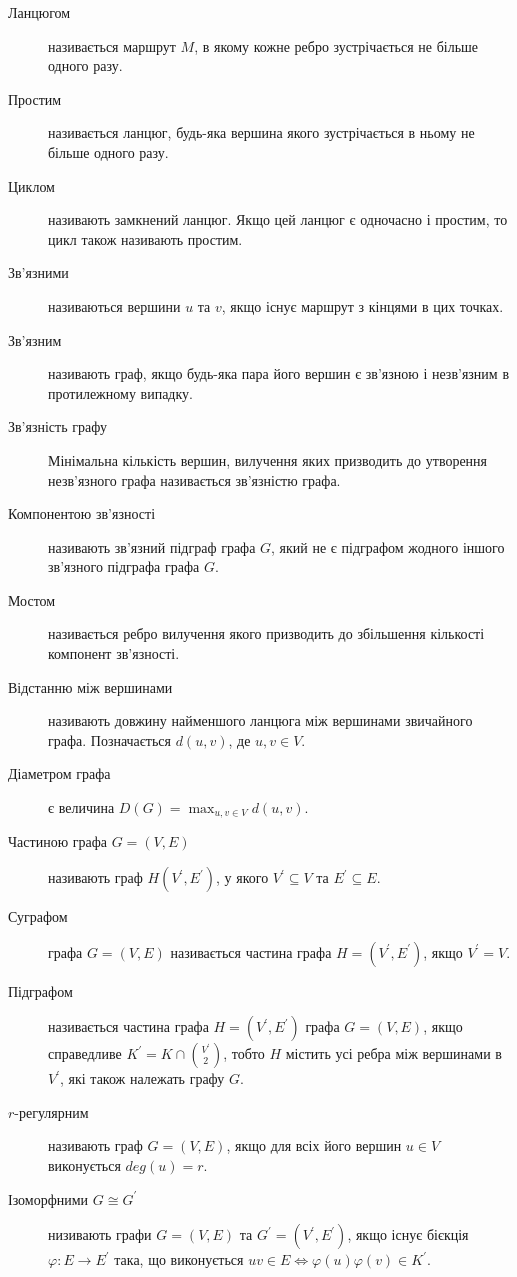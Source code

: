 \begin{description}
\item[Ланцюгом] називається маршрут $M$, в якому кожне ребро зустрічається не більше одного разу.
\item[Простим] називається ланцюг, будь-яка вершина якого зустрічається в ньому не більше одного разу.
\item[Циклом] називають замкнений ланцюг. Якщо цей ланцюг є одночасно і простим, то цикл також називають простим.
\item[Зв'язними] називаються вершини $u$ та $v$, якщо існує маршрут з кінцями в цих точках.
\item[Зв'язним] називають граф, якщо будь-яка пара його вершин є зв'язною і незв'язним в протилежному випадку.
\item[Зв'язність графу] Мінімальна кількість вершин, вилучення яких призводить до утворення незв'язного графа називається зв'язністю графа.
\item[Компонентою зв'язності] називають зв'язний підграф графа $G$, який не є підграфом жодного іншого зв'язного підграфа графа $G$.
\item[Мостом] називається ребро вилучення якого призводить до збільшення кількості компонент зв'язності.
\item[Відстанню між вершинами] називають довжину найменшого ланцюга між вершинами звичайного графа. Позначається $d(u,v)$, де $u,v \in V$.
\item[Діаметром графа] є величина $D(G) = \displaystyle{\max_{u,v \in V}d(u,v)}$.
\item[Частиною графа $G=(V,E)$] називають граф $H(V^\prime,E^\prime)$, у якого $V^\prime \subseteq V$ та $E^\prime \subseteq E$.
\item[Суграфом] графа $G=(V,E)$ називається частина графа $H=(V^\prime,E^\prime)$, якщо $V^\prime=V$.
\item[Підграфом] називається частина графа $H=(V^\prime,E^\prime)$ графа $G=(V,E)$, якщо справедливе $K^\prime=K\cap {V^\prime \choose 2}$, тобто $H$ містить усі ребра між вершинами в $V^\prime$, які також належать графу $G$.
\item[$r$-регулярним] називають граф $G=(V,E)$, якщо для всіх його вершин $u \in V$ виконується $deg(u)=r$.
\item[Ізоморфними $G \cong G^\prime$] низивають графи $G = (V,E)$ та $G^\prime = (V^\prime,E^\prime)$, якщо існує бієкція $\varphi : E \to E^\prime$ така, що виконується $uv \in E \Leftrightarrow \varphi (u)\varphi (v) \in K^\prime$.
\end{description}
